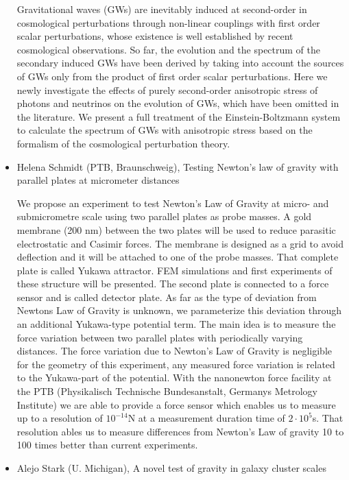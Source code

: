 \documentclass[letterpaper,12pt]{article}
\newcommand{\talk}[2]{{\fontspec{Lato Bold} #1,} {\fontspec{Lato Italic} #2}}
\begin{document}
\begin{itemize}
Gravitational waves (GWs) are inevitably induced at second-order in cosmological perturbations through non-linear couplings with first order scalar perturbations, whose existence is well established by recent cosmological observations. So far, the evolution and the spectrum of the secondary induced GWs have been derived by taking into account the sources of GWs only from the product of first order scalar perturbations. Here we newly investigate the effects of purely second-order anisotropic stress of photons and neutrinos on the evolution of GWs, which have been omitted in the literature. We present a full treatment of the Einstein-Boltzmann system to calculate the spectrum of GWs with anisotropic stress based on the formalism of the cosmological perturbation theory.

\item \talk{Helena Schmidt (PTB, Braunschweig)}{Testing Newton's law of gravity with parallel plates at micrometer distances}

We propose an experiment to test Newton's Law of Gravity at micro- and submicrometre scale using two parallel plates as probe masses. A gold membrane (200 nm) between the two plates will be used to reduce parasitic electrostatic and Casimir forces. The membrane is designed as a grid to avoid deflection and it will be attached to one of the probe masses. That complete plate is called Yukawa attractor. FEM simulations and first experiments of these structure will be presented. The second plate is connected to a force sensor and is called detector plate. As far as the type of deviation from Newtons Law of Gravity is unknown, we parameterize this deviation through an additional Yukawa-type potential term. The main idea is to measure the force variation between two parallel plates with periodically varying distances. The force variation due to Newton's Law of Gravity is negligible for the geometry of this experiment, any measured force variation is related to the Yukawa-part of the potential. With the nanonewton force facility at the PTB (Physikalisch Technische Bundesanstalt, Germanys Metrology Institute) we are able to provide a force sensor which enables us to measure up to a resolution of $10^{-14}$N at a measurement duration time of $2·10^5$s. That resolution ables us to measure differences from Newton's Law of gravity 10 to 100 times better than current experiments.

\item \talk{Alejo Stark (U. Michigan)}{A novel test of gravity in galaxy cluster scales}


\end{itemize}
\end{document}
